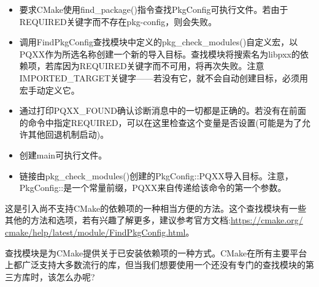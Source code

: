 \begin{itemize}
\item 
要求CMake使用find\_package()指令查找PkgConfig可执行文件。若由于REQUIRED关键字而不存在pkg-config，则会失败。

\item 
调用FindPkgConfig查找模块中定义的pkg\_check\_modules()自定义宏，以PQXX作为所选名称创建一个新的导入目标。查找模块将搜索名为libpxx的依赖项，若库因为REQUIRED关键字而不可用，将再次失败。注意IMPORTED\_TARGET关键字——若没有它，就不会自动创建目标，必须用宏手动定义它。


\item 
通过打印PQXX\_FOUND确认诊断消息中的一切都是正确的。若没有在前面的命令中指定REQUIRED，可以在这里检查这个变量是否设置(可能是为了允许其他回退机制启动)。

\item 
创建main可执行文件。

\item 
链接由pkg\_check\_modules()创建的PkgConfig::PQXX导入目标。注意，PkgConfig::是一个常量前缀，PQXX来自传递给该命令的第一个参数。
\end{itemize}

这是引入尚不支持CMake的依赖项的一种相当方便的方法。这个查找模块有一些其他的方法和选项，若有兴趣了解更多，建议参考官方文档:\url{https://cmake.org/ cmake/help/latest/module/FindPkgConfig.html}。

查找模块是为CMake提供关于已安装依赖项的一种方式。CMake在所有主要平台上都广泛支持大多数流行的库，但当我们想要使用一个还没有专门的查找模块的第三方库时，该怎么办呢?



















